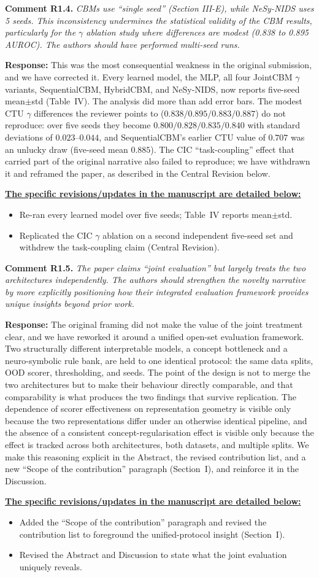 \documentclass[11pt]{article}
\newcommand{\cmt}[2]{\medskip\noindent\textbf{Comment #1.} \textit{#2}\par}
\newcommand{\resp}{\smallskip\par\noindent\textbf{Response:} }
\newcommand{\revs}{\smallskip\par\noindent\underline{\textbf{The specific revisions/updates in the manuscript are detailed below:}}\par}
\begin{document}
\cmt{R1.4}{CBMs use ``single seed'' (Section III-E), while NeSy-NIDS uses 5 seeds.
This inconsistency undermines the statistical validity of the CBM results,
particularly for the $\gamma$ ablation study where differences are modest (0.838
to 0.895 AUROC). The authors should have performed multi-seed runs.}
\resp This was the most consequential weakness in the original submission, and we
have corrected it. Every learned model, the MLP, all four JointCBM $\gamma$
variants, SequentialCBM, HybridCBM, and NeSy-NIDS, now reports five-seed
mean$\pm$std (Table~IV). The analysis did more than add error bars. The modest CTU
$\gamma$ differences the reviewer points to ($0.838/0.895/0.883/0.887$) do not
reproduce: over five seeds they become $0.800/0.828/0.835/0.840$ with standard
deviations of $0.023$--$0.044$, and SequentialCBM's earlier CTU value of $0.707$
was an unlucky draw (five-seed mean $0.885$). The CIC ``task-coupling'' effect
that carried part of the original narrative also failed to reproduce; we have
withdrawn it and reframed the paper, as described in the Central Revision below.
\revs
\begin{itemize}
  \item Re-ran every learned model over five seeds; Table~IV reports mean$\pm$std.
  \item Replicated the CIC $\gamma$ ablation on a second independent five-seed set
  and withdrew the task-coupling claim (Central Revision).
\end{itemize}

\cmt{R1.5}{The paper claims ``joint evaluation'' but largely treats the two
architectures independently. The authors should strengthen the novelty narrative
by more explicitly positioning how their integrated evaluation framework provides
unique insights beyond prior work.}
\resp The original framing did not make the value of the joint treatment clear, and
we have reworked it around a unified open-set evaluation framework. Two
structurally different interpretable models, a concept bottleneck and a
neuro-symbolic rule bank, are held to one identical protocol: the same data
splits, OOD scorer, thresholding, and seeds. The point of the design is not to
merge the two architectures but to make their behaviour directly comparable, and
that comparability is what produces the two findings that survive replication.
The dependence of scorer effectiveness on representation geometry is visible only
because the two representations differ under an otherwise identical pipeline, and
the absence of a consistent concept-regularisation effect is visible only because
the effect is tracked across both architectures, both datasets, and multiple
splits. We make this reasoning explicit in the Abstract, the revised contribution
list, and a new ``Scope of the contribution'' paragraph (Section~I), and reinforce
it in the Discussion.
\revs
\begin{itemize}
  \item Added the ``Scope of the contribution'' paragraph and revised the
  contribution list to foreground the unified-protocol insight (Section~I).
  \item Revised the Abstract and Discussion to state what the joint evaluation
  uniquely reveals.
\end{itemize}
\end{document}
